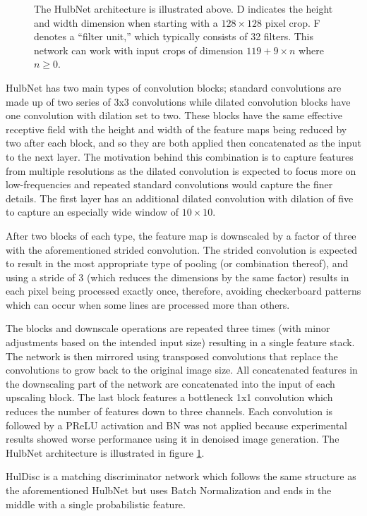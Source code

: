 
\begin{figure}
  \begin{center}
    \scalebox{0.5}{}
    \caption[HulbNet architecture]{The HulbNet architecture is illustrated above. D indicates the height and width dimension when starting with a $128\times 128$ pixel crop. F denotes a ``filter unit,'' which typically consists of 32 filters. This network can work with input crops of dimension $119+9\times n$ where $n \ge 0$.}
    \label{fig:Hulb128Net}
  \end{center}
\end{figure}

HulbNet has two main types of convolution blocks; standard convolutions are made up of two series of 3x3 convolutions while dilated convolution blocks have one convolution with dilation set to two. These blocks have the same effective receptive field with the height and width of the feature maps being reduced by two after each block, and so they are both applied then concatenated as the input to the next layer. The motivation behind this combination is to capture features from multiple resolutions as the dilated convolution is expected to focus more on low-frequencies and repeated standard convolutions would capture the finer details. The first layer has an additional dilated convolution with dilation of five to capture an especially wide window of $10\times 10$.

After two blocks of each type, the feature map is downscaled by a factor of three with the aforementioned strided convolution. The strided convolution is expected to result in the most appropriate type of pooling (or combination thereof), and using a stride of 3 (which reduces the dimensions by the same factor) results in each pixel being processed exactly once, therefore, avoiding checkerboard patterns which can occur when some lines are processed more than others.

The blocks and downscale operations are repeated three times (with minor adjustments based on the intended input size) resulting in a single feature stack. The network is then mirrored using transposed convolutions that replace the convolutions to grow back to the original image size. All concatenated features in the downscaling part of the network are concatenated into the input of each upscaling block. The last block features a bottleneck 1x1 convolution which reduces the number of features down to three channels.
Each convolution is followed by a \ac{PReLU} activation and \acl{BN} was not applied because experimental results showed worse performance using it in denoised image generation. The HulbNet architecture is illustrated in figure \ref{fig:Hulb128Net}. 

HulDisc is a matching discriminator network which follows the same structure as the aforementioned HulbNet but uses Batch Normalization and ends in the middle with a single probabilistic feature. %
